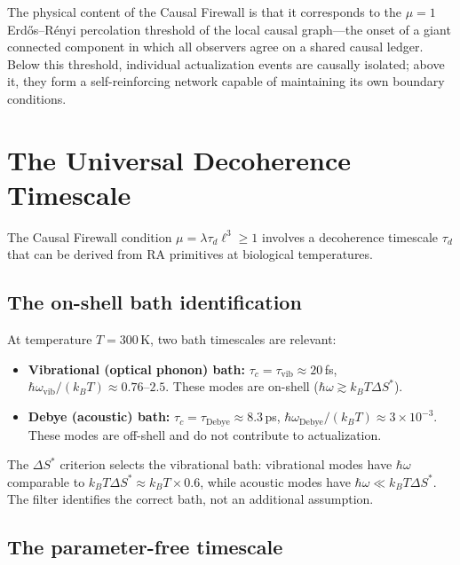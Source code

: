 \documentclass[11pt]{article}
\begin{document}
The physical content of the Causal Firewall is that it corresponds to the $\mu=1$ Erd\H{o}s--R\'enyi percolation threshold of the local causal graph---the onset of a giant connected component in which all observers agree on a shared causal ledger. Below this threshold, individual actualization events are causally isolated; above it, they form a self-reinforcing network capable of maintaining its own boundary conditions.

\section{The Universal Decoherence Timescale}
\label{sec:decoherence}

The Causal Firewall condition $\mu=\lambda\tau_d\ell^3\ge 1$ involves a decoherence timescale $\tau_d$ that can be derived from RA primitives at biological temperatures.

\subsection{The on-shell bath identification}

At temperature $T=300$\,K, two bath timescales are relevant:
\begin{itemize}[nosep]
\item \textbf{Vibrational (optical phonon) bath:} $\tau_c=\tau_{\mathrm{vib}}\approx 20$\,fs, $\hbar\omega_{\mathrm{vib}}/(k_BT)\approx 0.76$--$2.5$. These modes are on-shell ($\hbar\omega \gtrsim k_BT\Delta S^*$).
\item \textbf{Debye (acoustic) bath:} $\tau_c=\tau_{\mathrm{Debye}}\approx 8.3$\,ps, $\hbar\omega_{\mathrm{Debye}}/(k_BT)\approx 3\times 10^{-3}$. These modes are off-shell and do not contribute to actualization.
\end{itemize}

The $\Delta S^*$ criterion selects the vibrational bath: vibrational modes have $\hbar\omega$ comparable to $k_BT\Delta S^*\approx k_BT\times 0.6$, while acoustic modes have $\hbar\omega\ll k_BT\Delta S^*$. The filter identifies the correct bath, not an additional assumption.

\subsection{The parameter-free timescale}
\end{document}

